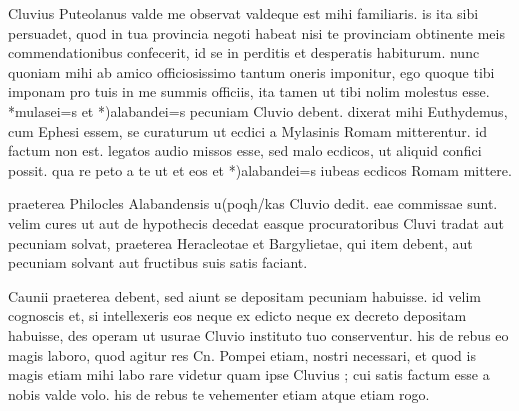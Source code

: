 


 Cluvius Puteolanus valde me observat valdeque est mihi familiaris. is ita sibi persuadet, quod in tua provincia negoti habeat nisi te provinciam obtinente meis commendationibus confecerit, id se in perditis et desperatis habiturum. nunc quoniam mihi ab amico officiosissimo tantum oneris imponitur, ego quoque tibi imponam pro tuis in me summis officiis, ita tamen ut tibi nolim molestus esse. *mulasei=s et *)alabandei=s pecuniam Cluvio debent. dixerat mihi Euthydemus, cum Ephesi essem, se curaturum ut ecdici a Mylasinis Romam mitterentur. id factum non est. legatos audio missos esse, sed malo ecdicos, ut aliquid confici possit. qua re peto a te ut et eos et *)alabandei=s iubeas ecdicos Romam mittere.

 praeterea Philocles Alabandensis u(poqh/kas Cluvio dedit. eae commissae sunt. velim cures ut aut de hypothecis decedat easque procuratoribus Cluvi tradat aut pecuniam solvat, praeterea Heracleotae et Bargylietae, qui item debent, aut pecuniam solvant aut fructibus suis satis faciant.

 Caunii praeterea debent, sed aiunt se depositam pecuniam habuisse. id velim cognoscis et, si intellexeris eos neque ex edicto neque ex decreto depositam habuisse, des operam ut usurae Cluvio instituto tuo conserventur. his de rebus eo magis laboro, quod agitur res Cn. Pompei etiam, nostri necessari, et quod is magis etiam mihi labo rare videtur quam ipse Cluvius ; cui satis factum esse a nobis valde volo. his de rebus te vehementer etiam atque etiam rogo.
